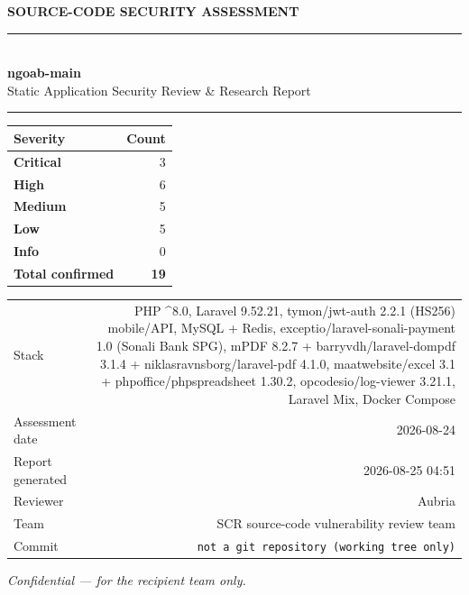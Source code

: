 \documentclass[11pt,a4paper]{article}
\newcommand{\sevbadge}[1]{\textbf{\textcolor{sev#1}{#1}}}
\begin{document}
\thispagestyle{empty}
\vspace*{2.2cm}\begin{center}
{\small\bfseries\color{sevLow}\uppercase{Source-Code Security Assessment}}\\[0.4cm]
\rule{\textwidth}{1.2pt}\\[0.5cm]
{\Huge\bfseries ngoab-main}\\[0.35cm]
{\large Static Application Security Review \& Research Report}\\[0.3cm]
\rule{\textwidth}{1.2pt}\end{center}\vspace{1.4cm}
\begin{center}\begin{tabular}{lr}\toprule\textbf{Severity} & \textbf{Count}\\\midrule
\sevbadge{Critical} & 3 \\
\sevbadge{High} & 6 \\
\sevbadge{Medium} & 5 \\
\sevbadge{Low} & 5 \\
\sevbadge{Info} & 0 \\
\midrule\textbf{Total confirmed} & \textbf{19}\\\bottomrule\end{tabular}\end{center}
\vfill
{\renewcommand{\arraystretch}{1.35}%
\begin{tabularx}{\textwidth}{L R}
\toprule
Stack & PHP \textasciicircum{}8.0, Laravel 9.52.21, tymon/jwt-auth 2.2.1 (HS256) mobile/API, MySQL + Redis, exceptio/laravel-sonali-payment 1.0 (Sonali Bank SPG), mPDF 8.2.7 + barryvdh/laravel-dompdf 3.1.4 + niklasravnsborg/laravel-pdf 4.1.0, maatwebsite/excel 3.1 + phpoffice/phpspreadsheet 1.30.2, opcodesio/log-viewer 3.21.1, Laravel Mix, Docker Compose \\
Assessment date & 2026-08-24 \\
Report generated & 2026-08-25 04:51 \\
Reviewer & Aubria \\
Team & SCR source-code vulnerability review team \\
Commit & \texttt{not a git repository (working tree only)} \\
\bottomrule
\end{tabularx}}

\begin{center}\small\itshape Confidential — for the recipient team only.\end{center}
\clearpage
\thispagestyle{fancy}\tableofcontents\clearpage
\end{document}
